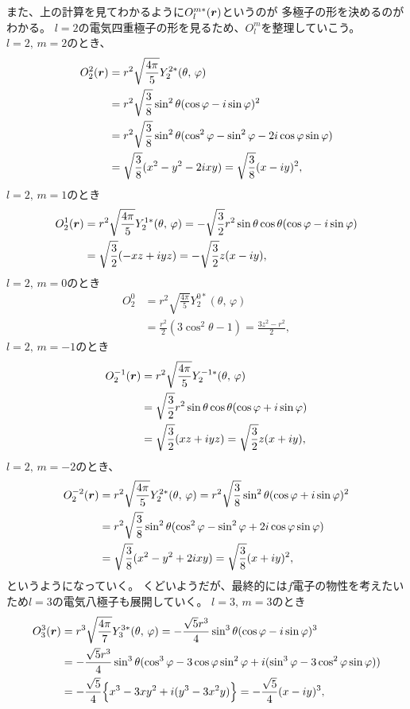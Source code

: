 \documentclass[../../master.tex]{subfiles}
\begin{document}
また、上の計算を見てわかるように\(O_l^{m*}(\vb*{r})\)というのが
多極子の形を決めるのがわかる。
\(l=2\)の電気四重極子の形を見るため、\(O_l^m\)を整理していこう。
\(l=2,\,m=2\)のとき、
\begin{align}
    O_2^{2}(\vb*{r})
    &= r^2\sqrt{\frac{4\pi}{5}}Y_2^{2*}(\theta,\,\varphi)\\
    &= r^2\sqrt{\frac{3}{8}} \sin^2\theta(\cos\varphi - i\sin\varphi)^2\\
    &= r^2\sqrt{\frac{3}{8}}\sin^2\theta(\cos^2\varphi-\sin^2\varphi - 2i\cos\varphi\sin\varphi)\\
    &=\sqrt{\frac{3}{8}}(x^2-y^2-2ixy)
    =\sqrt{\frac{3}{8}}(x-iy)^2,
\end{align}
\(l=2,\,m=1\)のとき
\begin{align}
    O_2^{1}(\vb*{r})
    &= r^2 \sqrt{\frac{4\pi}{5}}Y_2^{1*}(\theta,\,\varphi)
    = -\sqrt{\frac{3}{2}}r^2\sin\theta\cos\theta (\cos\varphi - i\sin\varphi)\\
    &= \sqrt{\frac{3}{2}}(-xz+iyz) = -\sqrt{\frac{3}{2}}z(x-iy),
\end{align}
\(l=2,\,m=0\)のとき
\begin{align}
    O_2^{0}
    &= r^2 \sqrt{\frac{4\pi}{5}}Y_2^{0*}(\theta,\,\varphi)\\
    &= \frac{r^2}{2}(3\cos^2\theta-1) = \frac{3z^2-r^2}{2},
\end{align}
\(l=2,\,m=-1\)のとき
\begin{align}
    O_2^{-1}(\vb*{r})
    &= r^2 \sqrt{\frac{4\pi}{5}}Y_2^{-1*}(\theta,\,\varphi)\\
    &= \sqrt{\frac{3}{2}}r^2\sin\theta\cos\theta (\cos\varphi + i\sin\varphi)\\
    &= \sqrt{\frac{3}{2}}(xz+iyz) = \sqrt{\frac{3}{2}}z(x+iy),
\end{align}
\(l=2,\,m=-2\)のとき、
\begin{align}
    O_2^{-2}(\vb*{r})
    &= r^2\sqrt{\frac{4\pi}{5}}Y_2^{2*}(\theta,\,\varphi)
    = r^2\sqrt{\frac{3}{8}} \sin^2\theta(\cos\varphi + i\sin\varphi)^2\\
    &= r^2\sqrt{\frac{3}{8}} \sin^2\theta(\cos^2\varphi-\sin^2\varphi + 2i\cos\varphi\sin\varphi)\\
    &=\sqrt{\frac{3}{8}}(x^2-y^2+2ixy) = \sqrt{\frac{3}{8}}(x+iy)^2,
\end{align}
というようになっていく。
くどいようだが、最終的には\(f\)電子の物性を考えたいため\(l=3\)の電気八極子も展開していく。
\(l=3,\,m=3\)のとき
\begin{align}
    O_3^3(\vb*{r})
    &= r^3 \sqrt{\frac{4\pi}{7}} Y_3^{3*}(\theta,\,\varphi)
    = -\frac{\sqrt{5}r^3}{4} \sin^3\theta (\cos\varphi-i\sin\varphi)^3\\
    &= -\frac{\sqrt{5}r^3}{4} \sin^3\theta (\cos^3\varphi - 3\cos\varphi\sin^2\varphi + i(\sin^3\varphi - 3\cos^2\varphi\sin\varphi))\\
    &= -\frac{\sqrt{5}}{4} \Big\{x^3-3xy^2+i(y^3- 3x^2y)\Big\}
    = -\frac{\sqrt{5}}{4} (x-iy)^3,
\end{align}
\end{document}
